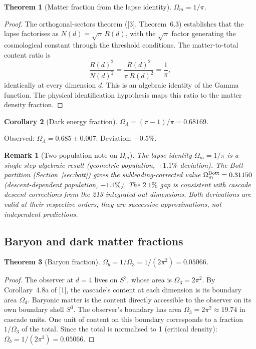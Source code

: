 \documentclass[12pt,a4paper]{article}
\newtheorem{theorem}{Theorem}[section]
\newtheorem{corollary}[theorem]{Corollary}
\newtheorem*{remark}{Remark}
\begin{document}
\begin{theorem}[Matter fraction from the lapse identity]\label{thm:omega_m}
$\Omega_m = 1/\pi$.
\end{theorem}

\begin{proof}
The orthogonal-sectors theorem ([3], Theorem~6.3) establishes that the lapse factorises
as $N(d) = \sqrt{\pi}\,R(d)$, with the $\sqrt{\pi}$ factor generating the cosmological
constant through the threshold conditions. The matter-to-total content ratio is
\[
\frac{R(d)^2}{N(d)^2} = \frac{R(d)^2}{\pi\,R(d)^2} = \frac{1}{\pi},
\]
identically at every dimension $d$. This is an algebraic identity of the Gamma function.
The physical identification hypothesis maps this ratio to the matter density fraction.
\end{proof}

\begin{corollary}[Dark energy fraction]
$\Omega_\Lambda = (\pi-1)/\pi = 0.68169$.
\end{corollary}

Observed: $\Omega_\Lambda = 0.685 \pm 0.007$. Deviation: $-0.5\%$.

\begin{remark}[Two-population note on $\Omega_m$]
The lapse identity $\Omega_m = 1/\pi$ is a single-step algebraic result (geometric population,
$+1.1\%$ deviation). The Bott partition (Section~\ref{sec:bott}) gives the
subleading-corrected value $\Omega_m^{\rm Bott} = 0.31150$ (descent-dependent population,
$-1.1\%$). The $2.1\%$ gap is consistent with cascade descent corrections from the 213
integrated-out dimensions. Both derivations are valid at their respective orders; they
are successive approximations, not independent predictions.
\end{remark}

\subsection{Baryon and dark matter fractions}

\begin{theorem}[Baryon fraction]\label{thm:omega_b}
$\Omega_b = 1/\Omega_3 = 1/(2\pi^2) = 0.05066$.
\end{theorem}

\begin{proof}
The observer at $d = 4$ lives on $S^3$, whose area is $\Omega_3 = 2\pi^2$.
By Corollary~4.8a of [1], the cascade's content at each dimension is its boundary area
$\Omega_d$. Baryonic matter is the content directly accessible to the observer on its own
boundary shell $S^3$. The observer's boundary has area $\Omega_3 = 2\pi^2 \approx 19.74$ in
cascade units. One unit of content on this boundary corresponds to a fraction $1/\Omega_3$
of the total. Since the total is normalised to 1 (critical density):
$\Omega_b = 1/(2\pi^2) = 0.05066$.
\end{proof}
\end{document}
